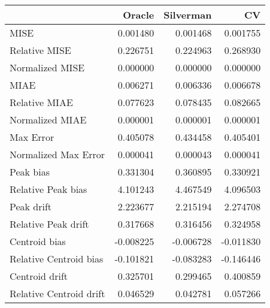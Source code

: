 \begin{tabular}{lrrr}
  \hline
 & Oracle & Silverman & CV \\ 
  \hline
MISE & 0.001480 & 0.001468 & 0.001755 \\ 
  Relative MISE & 0.226751 & 0.224963 & 0.268930 \\ 
  Normalized MISE & 0.000000 & 0.000000 & 0.000000 \\ 
  MIAE & 0.006271 & 0.006336 & 0.006678 \\ 
  Relative MIAE & 0.077623 & 0.078435 & 0.082665 \\ 
  Normalized MIAE & 0.000001 & 0.000001 & 0.000001 \\ 
  Max Error & 0.405078 & 0.434458 & 0.405401 \\ 
  Normalized Max Error & 0.000041 & 0.000043 & 0.000041 \\ 
  Peak bias & 0.331304 & 0.360895 & 0.330921 \\ 
  Relative Peak bias & 4.101243 & 4.467549 & 4.096503 \\ 
  Peak drift & 2.223677 & 2.215194 & 2.274708 \\ 
  Relative Peak drift & 0.317668 & 0.316456 & 0.324958 \\ 
  Centroid bias & -0.008225 & -0.006728 & -0.011830 \\ 
  Relative Centroid bias & -0.101821 & -0.083283 & -0.146446 \\ 
  Centroid drift & 0.325701 & 0.299465 & 0.400859 \\ 
  Relative Centroid drift & 0.046529 & 0.042781 & 0.057266 \\ 
   \hline
\end{tabular}
